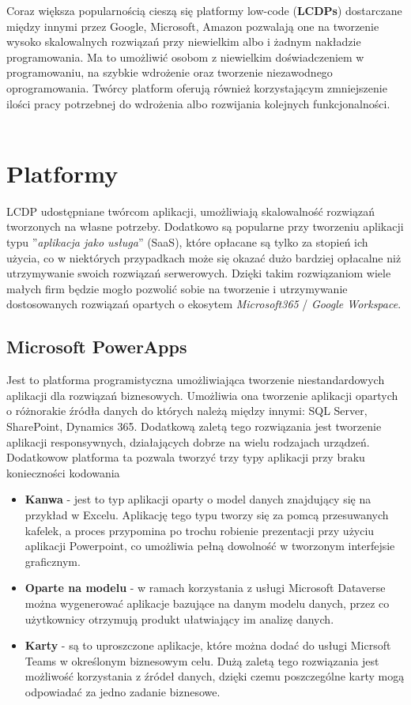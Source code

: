 Coraz większa popularnością cieszą się platformy low-code (\textbf{LCDPs}) dostarczane między innymi przez Google, Microsoft, Amazon pozwalają one na tworzenie wysoko skalowalnych rozwiązań przy niewielkim albo i żadnym nakładzie programowania. Ma to umożliwić osobom z niewielkim doświadczeniem w programowaniu, na szybkie wdrożenie oraz tworzenie niezawodnego oprogramowania. Twórcy platform oferują również korzystającym zmniejszenie ilości pracy potrzebnej do wdrożenia albo rozwijania kolejnych funkcjonalności\cite{Bock2021, Hirzel2022}.
\\ \\
\section{Platformy}
LCDP udostępniane twórcom aplikacji, umożliwiają skalowalność rozwiązań tworzonych na własne potrzeby. Dodatkowo są popularne przy tworzeniu aplikacji typu ''\textit{aplikacja jako usługa}''  (SaaS), które opłacane są tylko za stopień ich użycia, co w niektórych przypadkach może się okazać dużo bardziej opłacalne niż utrzymywanie swoich rozwiązań serwerowych. Dzięki takim rozwiązaniom wiele małych firm będzie mogło pozwolić sobie na tworzenie i utrzymywanie dostosowanych rozwiązań opartych o ekosytem \textit{Microsoft365} / \textit{Google Workspace}.

\subsection{Microsoft PowerApps}
Jest to platforma programistyczna umożliwiająca tworzenie niestandardowych aplikacji dla rozwiązań biznesowych. Umożliwia ona tworzenie aplikacji opartych o różnorakie źródła danych do których należą między innymi: SQL Server, SharePoint, Dynamics 365. Dodatkową zaletą tego rozwiązania jest tworzenie aplikacji responsywnych, działających dobrze na wielu rodzajach urządzeń. Dodatkowow platforma ta pozwala tworzyć trzy typy aplikacji przy braku konieczności kodowania\cite{Microsoftc}
\begin{itemize}
    \item \textbf{Kanwa} - jest to typ aplikacji oparty o model danych znajdujący się na przykład w Excelu. Aplikację tego typu tworzy się za pomcą przesuwanych kafelek, a proces przypomina po trochu robienie prezentacji przy użyciu aplikacji Powerpoint, co umożliwia pełną dowolność w tworzonym interfejsie graficznym\cite{Microsoftb}.

    \item \textbf{Oparte na modelu} - w ramach korzystania z usługi Microsoft Dataverse można wygenerować aplikacje bazujące na danym modelu danych, przez co użytkownicy otrzymują produkt ułatwiający im analizę danych\cite{Microsofta}.

    \item \textbf{Karty} - są to uproszczone aplikacje, które można dodać do usługi Micrsoft Teams w określonym biznesowym celu. Dużą zaletą tego rozwiązania jest możliwość korzystania z źródeł danych, dzięki czemu poszczególne karty mogą odpowiadać za jedno zadanie biznesowe\cite{Microsoft}.
\end{itemize}

